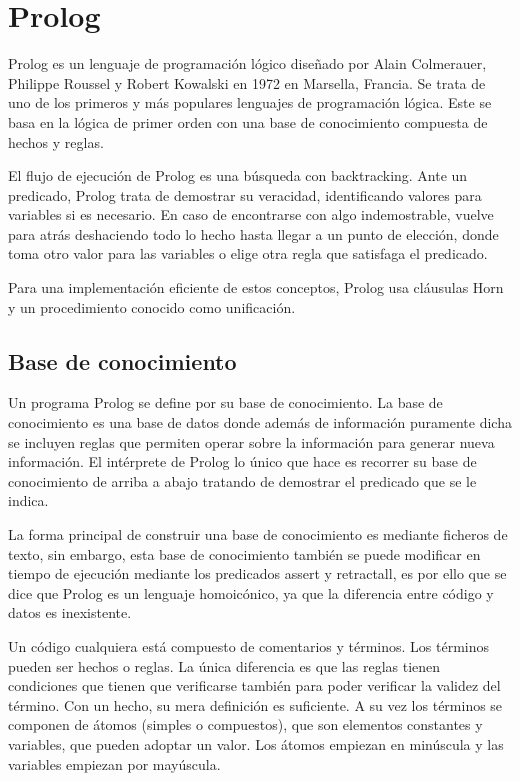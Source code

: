 \documentclass[12pt]{report} %
\begin{document}
\section{Prolog}

Prolog\cite{prolog} es un lenguaje de programación lógico diseñado por Alain Colmerauer, Philippe Roussel y Robert Kowalski en 1972 en Marsella, Francia. Se trata de uno de los primeros y más populares lenguajes de programación lógica. Este se basa en la lógica de primer orden con una base de conocimiento compuesta de hechos y reglas. 

El flujo de ejecución de Prolog es una búsqueda con backtracking. Ante un predicado, Prolog trata de demostrar su veracidad, identificando valores para variables si es necesario. En caso de encontrarse con algo indemostrable, vuelve para atrás deshaciendo todo lo hecho hasta llegar a un punto de elección, donde toma otro valor para las variables o elige otra regla que satisfaga el predicado.

Para una implementación eficiente de estos conceptos, Prolog usa cláusulas Horn y un procedimiento conocido como unificación.

\subsection{Base de conocimiento}

Un programa Prolog se define por su base de conocimiento. La base de conocimiento es una base de datos donde además de información puramente dicha se incluyen reglas que permiten operar sobre la información para generar nueva información. El intérprete de Prolog lo único que hace es recorrer su base de conocimiento de arriba a abajo tratando de demostrar el predicado que se le indica.

La forma principal de construir una base de conocimiento es mediante ficheros de texto, sin embargo, esta base de conocimiento también se puede modificar en tiempo de ejecución mediante los predicados assert y retractall, es por ello que se dice que Prolog es un lenguaje homoicónico, ya que la diferencia entre código y datos es inexistente.

Un código cualquiera está compuesto de comentarios y términos. Los términos pueden ser hechos o reglas. La única diferencia es que las reglas tienen condiciones que tienen que verificarse también para poder verificar la validez del término. Con un hecho, su mera definición es suficiente. A su vez los términos se componen de átomos (simples o compuestos), que son elementos constantes y variables, que pueden adoptar un valor. Los átomos empiezan en minúscula y las variables empiezan por mayúscula.
\end{document}
